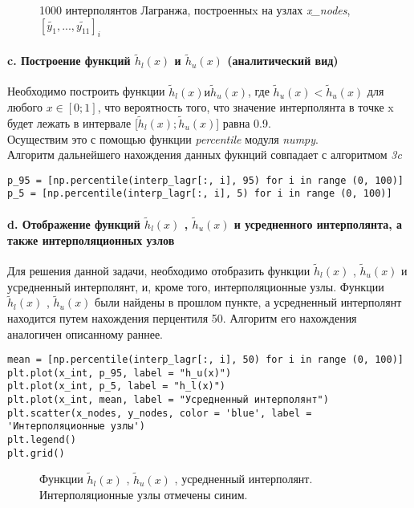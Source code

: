 \begin{figure}[b!]
\caption{1000 интерполянтов Лагранжа, построенныx на узлах \textit{x_nodes}, $[\tilde{y_1}, ..., \tilde{y_{11}}]_i$ }
\end{figure}
\paragraph{c. Построение функций  $\tilde{h}_l(x)$ и $\tilde{h}_u(x)$ (аналитический вид) \\ }
\begin{flushleft}
Необходимо построить функции $\tilde{h}_l(x) и \tilde{h}_u(x)$, где $\tilde{h}_u(x) < \tilde{h}_u(x)$ для любого $x\in[0;1]$, что вероятность того, что значение интерполянта в точке x будет лежать в интервале [$\tilde{h}_l(x);\tilde{h}_u(x)$] равна 0.9.
\\
Осуществим это с помощью функции \textit{percentile} модуля \textit{numpy}.\\
Алгоритм дальнейшего нахождения данных фукнций совпадает с алгоритмом \textit{3c}
\end{flushleft}
\begin{lstlisting}
p_95 = [np.percentile(interp_lagr[:, i], 95) for i in range (0, 100)]
p_5 = [np.percentile(interp_lagr[:, i], 5) for i in range (0, 100)]
\end{lstlisting}
\paragraph{d. Отображение функций  $\tilde{h}_l(x)$ , $\tilde{h}_u(x)$ 
 и усредненного интерполянта, а также интерполяционных узлов\\ }
\begin{flushleft}
Для решения данной задачи, необходимо отобразить
функции  $\tilde{h}_l(x)$ , $\tilde{h}_u(x)$ 
и усредненный интерполянт, и, кроме того, интерполяционные узлы.
Функции $\tilde{h}_l(x)$ , $\tilde{h}_u(x)$ были найдены в прошлом пункте, а усредненный интерполянт находится путем нахождения перцентиля 50. Алгоритм его нахождения аналогичен описанному раннее.
\end{flushleft}
\begin{lstlisting}
mean = [np.percentile(interp_lagr[:, i], 50) for i in range (0, 100)]
plt.plot(x_int, p_95, label = "h_u(x)")
plt.plot(x_int, p_5, label = "h_l(x)")
plt.plot(x_int, mean, label = "Усредненный интерполянт")
plt.scatter(x_nodes, y_nodes, color = 'blue', label = 'Интерполяционные узлы')
plt.legend()
plt.grid()
\end{lstlisting}
\clearpage
\begin{figure}[h]
\caption{Функции $\tilde{h}_l(x)$ , $\tilde{h}_u(x)$ 
, усредненный интерполянт. Интерполяционные узлы отмечены синим.}
\end{figure}
